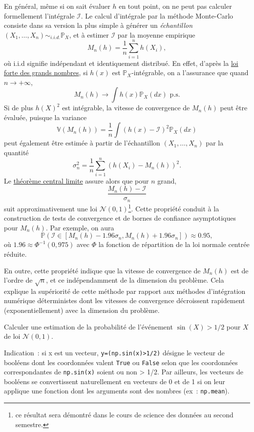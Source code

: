 En général, même si on sait évaluer \(h\) en tout point, on ne peut pas
calculer formellement l'intégrale \(\mathcal{I}\). Le calcul d'intégrale
par la méthode Monte-Carlo consiste dans sa version la plus simple à
générer un \emph{échantillon}
\((X_1,\ldots,X_n) \sim_{i.i.d.}\mathbb{P}_X\), et à estimer
\(\mathcal{I}\) par la moyenne empirique
\[M_n(h)=\frac{1}{n}\sum_{i=1}^{n}h(X_i),\] où i.i.d signifie
indépendant et identiquement distribué. En effet, d'après la
\href{Probabilité\%20III.pdf\%20\#lfgn}{loi forte des grands nombres},
si \(h(x)\) est \(\mathbb{P}_X\)-intégrable, on a l'assurance que quand
\(n \to +\infty\),
\[M_n(h) \rightarrow \int h(x)\mathbb{P}_X(dx) \text{ p.s.}\] Si de plus
\(h(X)^2\) est intégrable, la vitesse de convergence de \(M_n(h)\) peut
être évaluée, puisque la variance
\[\mathbb{V}(M_n(h)) = \frac{1}{n} \int \left(h(x)-\mathcal{I}\right)^2 \mathbb{P}_X(dx)\]
peut également être estimée à partir de l'échantillon
\((X_1,\ldots,X_n)\) par la quantité
\[\sigma_n^2=\frac{1}{n}\sum_{i=1}^{n}\left( h(X_i)-M_n(h)\right)^2.\]
Le \href{Probabilité\%20III.pdf\%20\#TCL}{théorème central limite}
assure alors que pour \(n\) grand,
\[\frac{M_n(h)-\mathcal{I}}{\sigma_n}\] suit approximativement une loi
\(\mathcal{N}(0,1)\)\footnote{ce résultat sera démontré dans le cours de
  science des données au second semestre.}. Cette propriété conduit à la
construction de tests de convergence et de bornes de confiance
asymptotiques pour \(M_n(h)\). Par exemple, on aura
\[\mathbb{P}\left(\mathcal{I} \in \left[M_n(h) - 1.96 \sigma_n,M_n(h) + 1.96 \sigma_n\right]\right) \approx 0.95,\]
où \(1.96 \approx \Phi^{-1}(0,975)\) avec \(\Phi\) la fonction de
répartition de la loi normale centrée réduite.

En outre, cette propriété indique que la vitesse de convergence de
\(M_n(h)\) est de l'ordre de \(\sqrt{n}\), et ce indépendamment de la
dimension du problème. Cela explique la supériorité de cette méthode par
rapport aux méthodes d'intégration numérique déterministes dont les
vitesses de convergence décroissent rapidement (exponentiellement) avec
la dimension du problème.

\label{V-mc1}
Calculer une estimation de la probabilité de l'événement
\(\sin(X) > 1/2\) pour \(X\) de loi \(\mathcal{N}(0, 1)\).

Indication~: si x est un vecteur,
\texttt{y=(np.sin(x)\textgreater{}1/2)} désigne le vecteur de booléens
dont les coordonnées valent \texttt{True} ou \texttt{False} selon que
les coordonnées correspondantes de \texttt{np.sin(x)} soient ou non
\textgreater{} 1/2. Par ailleurs, les vecteurs de booléens se
convertissent naturellement en vecteurs de 0 et de 1 si on leur applique
une fonction dont les arguments sont des nombres (ex~:
\texttt{np.mean}).

